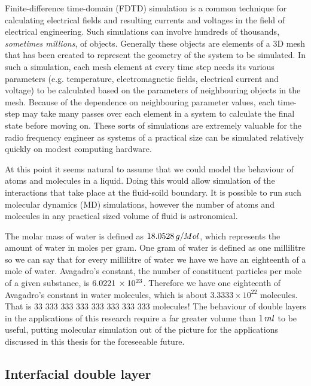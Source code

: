     Finite-difference time-domain (FDTD) simulation is a common technique for calculating electrical fields and resulting currents and voltages in the field of electrical engineering. Such simulations can involve hundreds of thousands, \emph{sometimes millions}, of objects. Generally these objects are elements of a 3D mesh that has been created to represent the geometry of the system to be simulated. In such a simulation, each mesh element at every time step needs its various parameters (e.g. temperature, electromagnetic fields, electrical current and voltage) to be calculated based on the parameters of neighbouring objects in the mesh. Because of the dependence on neighbouring parameter values, each time-step may take many passes over each element in a system to calculate the final state before moving on. These sorts of simulations are extremely valuable for the radio frequency engineer as systems of a practical size can be simulated relatively quickly on modest computing hardware.

    At this point it seems natural to assume that we could model the behaviour of atoms and molecules in a liquid. Doing this would allow simulation of the interactions that take place at the fluid-soild boundary. It is possible to run such molecular dynamics (MD) simulations, however the number of atoms and molecules in any practical sized volume of fluid is astronomical.

    The molar mass of water is defined as $18.0528\thinspace g/Mol$, which represents the amount of water in moles per gram. One gram of water is defined as one millilitre so we can say that for every millilitre of water we have we have an eighteenth of a mole of water. Avagadro's constant, the number of constituent particles per mole of a given substance, is $6.0221\thinspace \times 10^{23}$. Therefore we have one eighteenth of Avagadro's constant in water molecules, which is about $3.3333\times 10^{22}$ molecules. That is 33 333 333 333 333 333 333 333 molecules! The behaviour of double layers in the applications of this research require a far greater volume than $1\thinspace ml$ to be useful, putting molecular simulation out of the picture for the applications discussed in this thesis for the foreseeable future.

  \subsection{Interfacial double layer}

